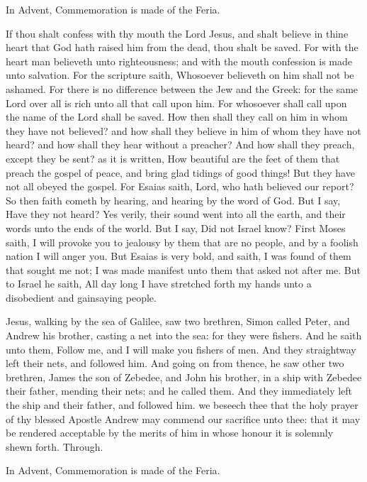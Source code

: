 \begin{rubric}
    In Advent, Commemoration is made of the Feria.
\end{rubric}

 If thou shalt confess with thy mouth the Lord Jesus, and shalt believe in thine heart that God hath raised him from the dead, thou shalt be saved. For with the heart man believeth unto righteousness; and with the mouth confession is made unto salvation. For the scripture saith, Whosoever believeth on him shall not be ashamed. For there is no difference between the Jew and the Greek: for the same Lord over all is rich unto all that call upon him. For whosoever shall call upon the name of the Lord shall be saved. How then shall they call on him in whom they have not believed? and how shall they believe in him of whom they have not heard? and how shall they hear without a preacher? And how shall they preach, except they be sent? as it is written, How beautiful are the feet of them that preach the gospel of peace, and bring glad tidings of good things! But they have not all obeyed the gospel. For Esaias saith, Lord, who hath believed our report? So then faith cometh by hearing, and hearing by the word of God. But I say, Have they not heard? Yes verily, their sound went into all the earth, and their words unto the ends of the world. But I say, Did not Israel know? First Moses saith, I will provoke you to jealousy by them that are no people, and by a foolish nation I will anger you. But Esaias is very bold, and saith, I was found of them that sought me not; I was made manifest unto them that asked not after me. But to Israel he saith, All day long I have stretched forth my hands unto a disobedient and gainsaying people.


 Jesus, walking by the sea of Galilee, saw two brethren, Simon called Peter, and Andrew his brother, casting a net into the sea: for they were fishers. And he saith unto them, Follow me, and I will make you fishers of men. And they straightway left their nets, and followed him. And going on from thence, he saw other two brethren, James the son of Zebedee, and John his brother, in a ship with Zebedee their father, mending their nets; and he called them. And they immediately left the ship and their father, and followed him.
\secret
{} we beseech thee that the holy prayer of thy blessed Apostle Andrew may commend our sacrifice unto thee: that it may be rendered acceptable by the merits of him in whose honour it is solemnly shewn forth. Through.
\begin{rubric}
    In Advent, Commemoration is made of the Feria.
\end{rubric}

